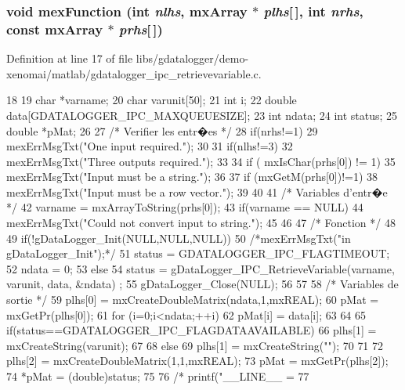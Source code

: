\subsubsection[{mexFunction}]{\setlength{\rightskip}{0pt plus 5cm}void mexFunction (int {\em nlhs}, \/  mxArray $\ast$ {\em plhs}[$\,$], \/  int {\em nrhs}, \/  const mxArray $\ast$ {\em prhs}[$\,$])}\label{libs_2gdatalogger_2demo-xenomai_2matlab_2gdatalogger__ipc__retrievevariable_8c_a6a215cbfde54f82a3ce599228fc3fce5}


Definition at line 17 of file libs/gdatalogger/demo-\/xenomai/matlab/gdatalogger\_\-ipc\_\-retrievevariable.c.


\begin{DoxyCode}
18 {
19         char  *varname;
20         char  varunit[50];
21         int       i;
22         double data[GDATALOGGER_IPC_MAXQUEUESIZE];
23         int ndata;
24     int status;
25         double *pMat;
26 
27         /* Verifier les entr�es */
28         if(nrhs!=1){
29                 mexErrMsgTxt("One input required.");
30                 }
31         if(nlhs!=3){
32                 mexErrMsgTxt("Three outputs required.");
33                 }
34     if ( mxIsChar(prhs[0]) != 1){
35       mexErrMsgTxt("Input must be a string.");
36         }
37     if (mxGetM(prhs[0])!=1){
38       mexErrMsgTxt("Input must be a row vector.");
39         }
40                 
41         /* Variables d'entr�e */
42     varname = mxArrayToString(prhs[0]);
43     if(varname == NULL) {
44       mexErrMsgTxt("Could not convert input to string.");
45         }
46 
47         /* Fonction */
48 
49         if(!gDataLogger_Init(NULL,NULL,NULL)){
50                 /*mexErrMsgTxt("\nError in gDataLogger_Init\n\n");*/
51         status = GDATALOGGER_IPC_FLAGTIMEOUT;
52         ndata = 0;
53         } else{
54         status = gDataLogger_IPC_RetrieveVariable(varname, varunit, data, &ndata)
      ;
55         gDataLogger_Close(NULL);
56     }
57     
58         /* Variables de sortie */
59         plhs[0] = mxCreateDoubleMatrix(ndata,1,mxREAL);
60         pMat = mxGetPr(plhs[0]);
61         for (i=0;i<ndata;++i){
62                 pMat[i] = data[i];
63         }
64     
65     if(status==GDATALOGGER_IPC_FLAGDATAAVAILABLE){
66         plhs[1] = mxCreateString(varunit);
67     }
68     else{
69         plhs[1] = mxCreateString("");
70     }
71     
72     plhs[2] = mxCreateDoubleMatrix(1,1,mxREAL);
73         pMat = mxGetPr(plhs[2]);
74     *pMat = (double)status;
75     
76 /*    printf("__LINE__ = %
77 }
\end{DoxyCode}
